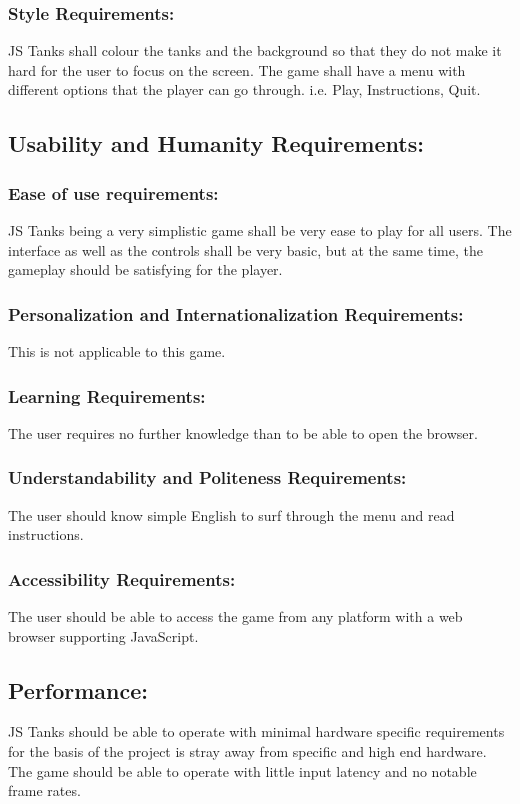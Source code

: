 \documentclass{article}
\begin{document}
\subsubsection{Style Requirements:}
JS Tanks shall colour the tanks and the background so that they do not make it
hard for the user to focus on the screen. The game shall have a menu with
different options that the player can go through. i.e. Play, Instructions, Quit.

\subsection{Usability and Humanity Requirements:}
\subsubsection{Ease of use requirements:}
JS Tanks being a very simplistic game shall be very ease to play for all users. 
The interface as well as the controls shall be very basic, but at the same time, 
the gameplay should be satisfying for the player.
\subsubsection{Personalization and Internationalization Requirements:}
This is not applicable to this game.
\subsubsection{Learning Requirements:}
The user requires no further knowledge than to be able to open the browser.
\subsubsection{Understandability and Politeness Requirements:}
The user should know simple English to surf through the menu and read 
instructions.
\subsubsection{Accessibility Requirements:}
The user should be able to access the game from any platform with a web browser 
supporting JavaScript.
\subsection{Performance:}
JS Tanks should be able to operate with minimal hardware specific requirements 
for the basis of the project is stray away from specific and high end hardware. 
The game should be able to operate with little input latency and no notable 
frame rates.
\end{document}

